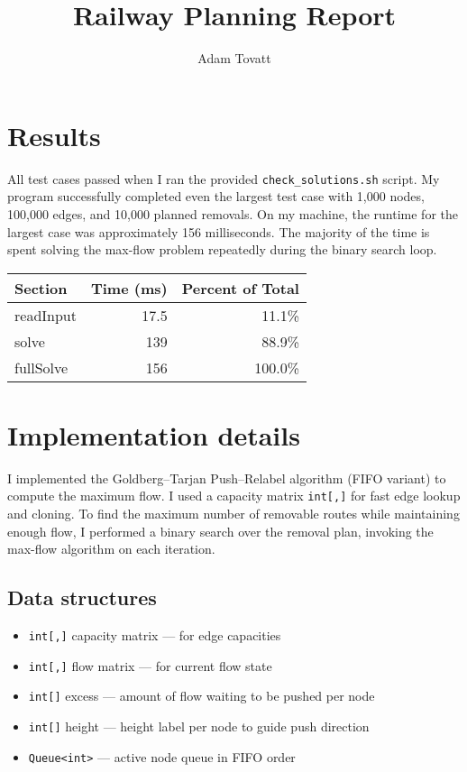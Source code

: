 \documentclass{article}
\title{Railway Planning Report}
\author{Adam Tovatt}
\begin{document}
  \maketitle

  \section{Results}

All test cases passed when I ran the provided \texttt{check\_solutions.sh} script. My program successfully completed even the largest test case with 1,000 nodes, 100,000 edges, and 10,000 planned removals. On my machine, the runtime for the largest case was approximately 156 milliseconds. The majority of the time is spent solving the max-flow problem repeatedly during the binary search loop.\\ 

\begin{tabular}{lrr}
\textbf{Section} & \textbf{Time (ms)} & \textbf{Percent of Total} \\
\toprule
readInput     & 17.5   & 11.1\% \\
solve         & 139    & 88.9\% \\
fullSolve     & 156    & 100.0\% \\
\bottomrule
\end{tabular}

  \clearpage
  \section{Implementation details}

I implemented the Goldberg–Tarjan Push–Relabel algorithm (FIFO variant) to compute the maximum flow. I used a capacity matrix \texttt{int[,]} for fast edge lookup and cloning. To find the maximum number of removable routes while maintaining enough flow, I performed a binary search over the removal plan, invoking the max-flow algorithm on each iteration.

\subsection*{Data structures}
\begin{itemize}
  \item \texttt{int[,]} capacity matrix — for edge capacities
  \item \texttt{int[,]} flow matrix — for current flow state
  \item \texttt{int[]} excess — amount of flow waiting to be pushed per node
  \item \texttt{int[]} height — height label per node to guide push direction
  \item \texttt{Queue<int>} — active node queue in FIFO order
\end{itemize}
\end{document}
